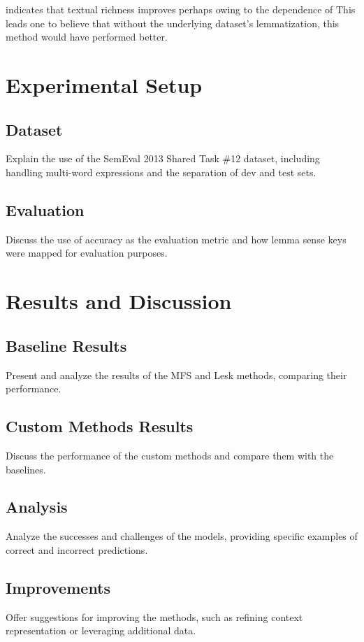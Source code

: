 \documentclass[11pt]{article}
\begin{document}
indicates that textual richness improves perhaps owing to the dependence of
This leads one to believe that without the underlying dataset's lemmatization, this method would have performed better. 
\section{Experimental Setup}
\subsection{Dataset}
Explain the use of the SemEval 2013 Shared Task \#12 dataset, including handling multi-word expressions and the separation of dev and test sets.

\subsection{Evaluation}
Discuss the use of accuracy as the evaluation metric and how lemma sense keys were mapped for evaluation purposes.

\section{Results and Discussion}
\subsection{Baseline Results}
Present and analyze the results of the MFS and Lesk methods, comparing their performance.

\subsection{Custom Methods Results}
Discuss the performance of the custom methods and compare them with the baselines.

\subsection{Analysis}
Analyze the successes and challenges of the models, providing specific examples of correct and incorrect predictions.

\subsection{Improvements}
Offer suggestions for improving the methods, such as refining context representation or leveraging additional data.
\end{document}
